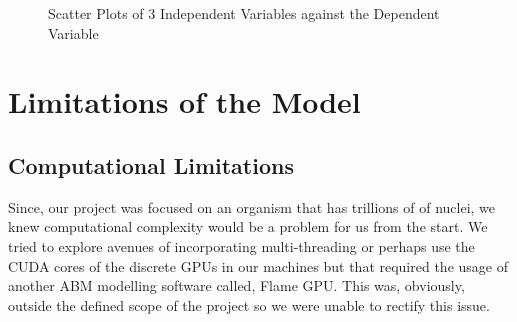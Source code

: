 \documentclass[a4paper, 11pt]{article}
\begin{document}
\begin{figure}[!h]
\centering
{}

\caption{Scatter Plots of 3 Independent Variables against the Dependent Variable}
\label{fig:whatever}
\end{figure}
\section{Limitations of the Model}
\subsection{Computational Limitations}
Since, our project was focused on an organism that has trillions of of nuclei, we knew computational complexity would be a problem for us from the start. We tried to explore avenues of incorporating multi-threading or perhaps use the CUDA cores of the discrete GPUs in our machines but that required the usage of another ABM modelling software called, Flame GPU. This was, obviously, outside the defined scope of the project so we were unable to rectify this issue.
\end{document}
